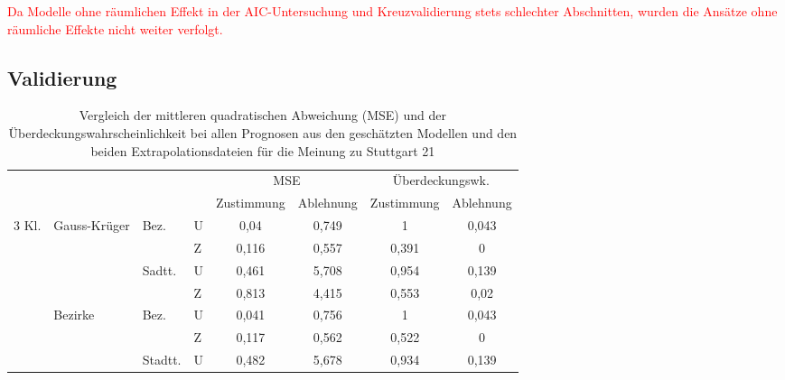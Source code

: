 \documentclass{Vorlage}
\begin{document}
\textcolor{red}{Da Modelle ohne räumlichen Effekt in der AIC-Untersuchung und Kreuzvalidierung stets schlechter 
Abschnitten, wurden die Ansätze ohne räumliche Effekte nicht weiter verfolgt.}

\subsection{Validierung}
\begin{table}[h]
\centering
\caption{Vergleich der mittleren quadratischen Abweichung (MSE) und der Überdeckungswahrscheinlichkeit bei allen Prognosen aus den geschätzten Modellen und den beiden Extrapolationsdateien für die Meinung zu Stuttgart 21}
\label{vali}
\begin{tabular}{llll|cc|cc}
\hline \hline
                        &                               &                          &   & \multicolumn{2}{c|}{MSE} & \multicolumn{2}{c}{Überdeckungswk.} \\
                        &                               &                          &   & Zustimmung  & Ablehnung  & Zustimmung        & Ablehnung       \\ \hline
\multirow{12}{*}{3 Kl.} & \multirow{4}{*}{Gauss-Krüger} & \multirow{2}{*}{Bez.}    & U & 0,04        & 0,749      & 1                 & 0,043           \\
                        &                               &                          & Z & 0,116       & 0,557      & 0,391             & 0               \\ \cline{3-8} 
                        &                               & \multirow{2}{*}{Sadtt.}  & U & 0,461       & 5,708      & 0,954             & 0,139           \\
                        &                               &                          & Z & 0,813       & 4,415      & 0,553             & 0,02            \\ \cline{2-8} 
                        & \multirow{4}{*}{Bezirke}      & \multirow{2}{*}{Bez.}    & U & 0,041       & 0,756      & 1                 & 0,043           \\
                        &                               &                          & Z & 0,117       & 0,562      & 0,522             & 0               \\ \cline{3-8} 
                        &                               & \multirow{2}{*}{Stadtt.} & U & 0,482       & 5,678      & 0,934             & 0,139           \\

\end{tabular}
\end{table}
\end{document}
